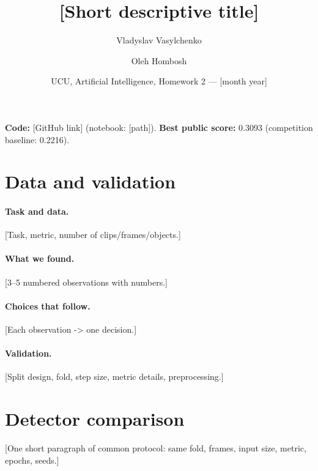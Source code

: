 \documentclass[11pt,a4paper]{article}
\title{[Short descriptive title]}
\author{Vladyslav Vasylchenko \and Oleh Hombosh}
\date{UCU, Artificial Intelligence, Homework 2 --- [month year]}
\begin{document}
\maketitle

\noindent\textbf{Code:} [GitHub link] (notebook: [path]).\quad
\textbf{Best public score:} 0.3093 (competition baseline: 0.2216).

\section{Data and validation}
\paragraph{Task and data.} [Task, metric, number of clips/frames/objects.]
\paragraph{What we found.} [3--5 numbered observations with numbers.]
\paragraph{Choices that follow.} [Each observation -> one decision.]
\paragraph{Validation.} [Split design, fold, step size, metric details, preprocessing.]

\section{Detector comparison}
[One short paragraph of common protocol: same fold, frames, input size, metric, epochs, seeds.]
\end{document}
